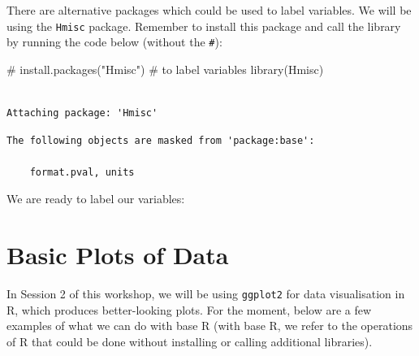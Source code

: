 \documentclass[
  letterpaper,
  DIV=11,
  numbers=noendperiod]{scrreprt}
\newenvironment{Shaded}{\begin{snugshade}}{\end{snugshade}}
\newcommand{\CommentTok}[1]{\textcolor[rgb]{0.37,0.37,0.37}{#1}}
\newcommand{\FunctionTok}[1]{\textcolor[rgb]{0.28,0.35,0.67}{#1}}
\newcommand{\NormalTok}[1]{\textcolor[rgb]{0.00,0.23,0.31}{#1}}
\newcommand{\OtherTok}[1]{\textcolor[rgb]{0.00,0.23,0.31}{#1}}
\newcommand{\SpecialCharTok}[1]{\textcolor[rgb]{0.37,0.37,0.37}{#1}}
\newcommand{\StringTok}[1]{\textcolor[rgb]{0.13,0.47,0.30}{#1}}
\begin{document}
There are alternative packages which could be used to label variables.
We will be using the \texttt{Hmisc} package. Remember to install this
package and call the library by running the code below (without the
\texttt{\#}):

\begin{Shaded}
\begin{Highlighting}[]
\CommentTok{\# install.packages("Hmisc") \# to label variables}
\FunctionTok{library}\NormalTok{(Hmisc)}
\end{Highlighting}
\end{Shaded}

\begin{verbatim}

Attaching package: 'Hmisc'
\end{verbatim}

\begin{verbatim}
The following objects are masked from 'package:base':

    format.pval, units
\end{verbatim}

We are ready to label our variables:

\begin{Shaded}
\end{Shaded}

\chapter{Basic Plots of Data}\label{basic-plots-of-data}

In Session 2 of this workshop, we will be using \texttt{ggplot2} for
data visualisation in R, which produces better-looking plots. For the
moment, below are a few examples of what we can do with base R (with
base R, we refer to the operations of R that could be done without
installing or calling additional libraries).
\end{document}
